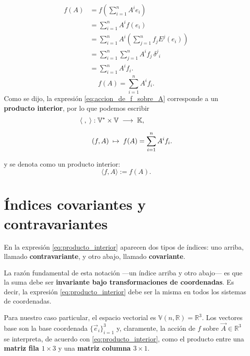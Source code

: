 \documentclass[../apunte_mecanica_clasica.tex]{subfiles}%
\begin{document}
\begin{align*}
    f(A) &= f\!\left(\sum_{i=1}^n A^i e_i \right) \\[6pt]
    &= \sum_{i=1}^n A^i f(e_i) \\[6pt]
    &= \sum_{i=1}^n A^i \left( \sum_{j=1}^n f_j E^j(e_i) \right) \\[6pt]
    &= \sum_{i=1}^n \sum_{j=1}^n A^i f_j \, \delta^j{}_i \\[6pt]
    &= \sum_{i=1}^n A^i f_i. 
\end{align*}
\begin{equation}\label{eq:accion_de_f_sobre_A}
    f(A)= \sum_{i=1}^n A^i f_i. 
\end{equation}
Como se dijo, la expresión \eqref{eq:accion_de_f_sobre_A} corresponde a un 
\textbf{producto interior}, por lo que podemos escribir
\begin{align}
    \langle \; , \; \rangle &:\mathbb{V}^* \times \mathbb{V} \;\longrightarrow\; \mathbb{K}, \notag \\[6pt]
    &(f, A) \;\mapsto\;  f(A) = \sum_{i=1}^n A^i f_i. \label{eq:producto_interior}
\end{align}

y se denota como un producto interior:
\begin{equation*}
    \langle f, A\rangle := f(A).
\end{equation*}


\section{Índices covariantes y contravariantes}

En la expresión \eqref{eq:producto_interior} aparecen dos tipos de índices:  
uno arriba, llamado \textbf{contravariante}, y otro abajo, llamado \textbf{covariante}.  

La razón fundamental de esta notación ---un índice arriba y otro abajo--- 
es que la suma debe ser \textbf{invariante bajo transformaciones de coordenadas}.  
Es decir, la expresión \eqref{eq:producto_interior} debe ser la misma en todos los sistemas de coordenadas.

Para nuestro caso particular, el espacio vectorial es 
$\mathbb{V}(n,\mathbb{R}) = \mathbb{R}^3$. 
Los vectores base son la base coordenada $\{\vec{e}_i\}_{i=1}^3$ y, 
claramente, la acción de $f$ sobre $\vec{A} \in \mathbb{R}^3$ 
se interpreta, de acuerdo con \eqref{eq:producto_interior}, 
como el producto entre una \textbf{matriz fila $1 \times 3$} 
y una \textbf{matriz columna $3 \times 1$}.  
\end{document}
